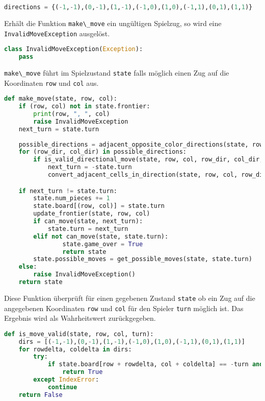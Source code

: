 \begin{lstlisting}[language=Python]
directions = {(-1,-1),(0,-1),(1,-1),(-1,0),(1,0),(-1,1),(0,1),(1,1)}
\end{lstlisting}

Erhält die Funktion \passthrough{\lstinline!make\_move!} ein ungültigen
Spielzug, so wird eine \passthrough{\lstinline!InvalidMoveException!}
ausgelöst.

\begin{lstlisting}[language=Python]
class InvalidMoveException(Exception):
    pass
\end{lstlisting}

\passthrough{\lstinline!make\_move!} führt im Spielzustand
\passthrough{\lstinline!state!} falls möglich einen Zug auf die
Koordinaten \passthrough{\lstinline!row!} und
\passthrough{\lstinline!col!} aus.

\begin{lstlisting}[language=Python]
def make_move(state, row, col):
    if (row, col) not in state.frontier:
        print(row, ", ", col)
        raise InvalidMoveException
    next_turn = state.turn
        
    possible_directions = adjacent_opposite_color_directions(state, row, col, state.turn)
    for (row_dir, col_dir) in possible_directions:
        if is_valid_directional_move(state, row, col, row_dir, col_dir, state.turn):
            next_turn = -state.turn
            convert_adjacent_cells_in_direction(state, row, col, row_dir, col_dir, state.turn)

    if next_turn != state.turn:
        state.num_pieces += 1
        state.board[(row, col)] = state.turn
        update_frontier(state, row, col)
        if can_move(state, next_turn):
            state.turn = next_turn
        elif not can_move(state, state.turn):
                state.game_over = True
                return state
        state.possible_moves = get_possible_moves(state, state.turn)
    else:
        raise InvalidMoveException()
    return state
\end{lstlisting}

Diese Funktion überprüft für einen gegebenen Zustand
\passthrough{\lstinline!state!} ob ein Zug auf die angegebenen
Koordinaten \passthrough{\lstinline!row!} und
\passthrough{\lstinline!col!} für den Spieler
\passthrough{\lstinline!turn!} möglich ist. Das Ergebnis wird als
Wahrheitswert zurückgegeben.

\begin{lstlisting}[language=Python]
def is_move_valid(state, row, col, turn):
    dirs = [(-1,-1),(0,-1),(1,-1),(-1,0),(1,0),(-1,1),(0,1),(1,1)]
    for rowdelta, coldelta in dirs:
        try:
            if state.board[row + rowdelta, col + coldelta] == -turn and is_valid_directional_move(state, row, col, rowdelta, coldelta, turn):
                return True
        except IndexError:
            continue
    return False
\end{lstlisting}

